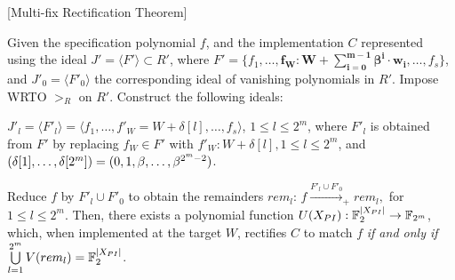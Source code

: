 \begin{Theorem}{[Multi-fix Rectification Theorem]}\label{Thm:rect}

Given the specification polynomial $f$, and the implementation
$C$ represented using the ideal $J' = \langle F'\rangle\subset R'$,
where $F'=\{f_1,\dots,\bm{f_W:W+\sum_{i=0}^{m-1}\beta^i \cdot w_i},
\dots,f_s\}$, and $J'_0=\langle F'_0\rangle$ the corresponding ideal
of vanishing polynomials in $R'$. Impose WRTO $>_R$ on $R'$.
Construct the following ideals: 

\bi
\item {\small $J'_l = \langle F'_l\rangle =\langle f_1,\dots,f'_W=W+\delta[l],\dots,f_s\rangle$},
  $1 \leq l \leq 2^m$, where $F'_l$ is obtained from $F'$ by
  replacing $f_W \in F'$ with $f'_W: W + \delta[l], 1\leq l \leq 2^m$,
  and $(\delta[1],\dots,\delta[2^{m}]) =
  (0,1,\beta,\dots,\beta^{2^m-2})$. 
\ei

Reduce $f$ by $F'_l\cup F'_0$ to obtain the remainders $rem_l$: 
$f\xrightarrow{F'_l\cup F'_{0}}_+ rem_l,$  for $1 \leq l \leq 2^m$. 
Then, there exists a polynomial function 
$U(X_{PI}): {\mathbb{F}}_{2}^{|X_{PI}|}\rightarrow {\mathbb{F}}_{2^m}$, which, when
 implemented at the target $W$, rectifies $C$ to match $f$ \textit{if
   and only if} $\bigcup\limits_{l=1}^{2^m}V(rem_l) = {\mathbb{F}}_{2}^{|X_{PI}|}$.
\end{Theorem}

